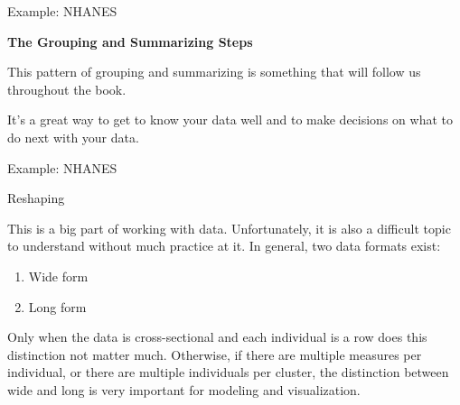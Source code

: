 \begin{frame}{Example: NHANES}

\centering
\textbf{The Grouping and Summarizing Steps}

This pattern of grouping and summarizing is something that will follow
us throughout the book.

It's a great way to get to know your data well and to make decisions on
what to do next with your data.

\end{frame}

\begin{frame}{Example: NHANES}

\begin{block}{Reshaping}

This is a big part of working with data. Unfortunately, it is also a
difficult topic to understand without much practice at it. In general,
two data formats exist:

\begin{enumerate}
\def\labelenumi{\arabic{enumi}.}
\tightlist
\item
  Wide form
\item
  Long form
\end{enumerate}

Only when the data is cross-sectional and each individual is a row does
this distinction not matter much. Otherwise, if there are multiple
measures per individual, or there are multiple individuals per cluster,
the distinction between wide and long is very important for modeling and
visualization.

\end{block}

\end{frame}

